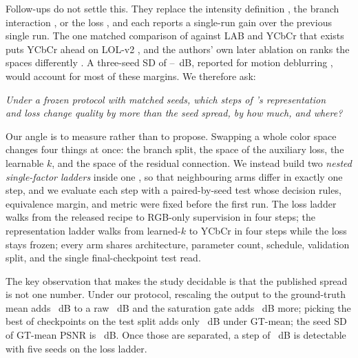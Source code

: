 Follow-ups do not settle this. They replace the intensity definition \citep{yang2026rhvifdd,
ai2026bcihv}, the branch interaction \citep{wang2026haimnet, wu2026tcanet}, or the loss
\citep{li2026pal}, and each reports a single-run gain over the previous single run. The one
matched comparison of \hvi against LAB and YCbCr that exists puts YCbCr ahead on LOL-v2
\citep{shi2025tpcnet}, and the authors' own later ablation on \dataset ranks the spaces
differently \citep{yan2025hvicidnetplus}. A three-seed SD of --~dB, reported for motion deblurring
\citep{shafi2026iphoneblur}, would account for most of these margins. We therefore ask:

\begin{center}
\emph{Under a frozen protocol with matched seeds, which steps of \mname's representation \\
and loss change \dataset quality by more than the seed spread, by how much, and where?}
\end{center}

Our angle is to measure rather than to propose. Swapping a whole color space changes four
things at once: the branch split, the space of the auxiliary loss, the learnable $k$, and the
space of the residual connection. We instead build two \emph{nested single-factor ladders}
inside one \mname, so that neighbouring arms differ in exactly one step, and we evaluate each
step with a paired-by-seed test whose decision rules, equivalence margin, and metric were
fixed before the first run. The loss ladder walks from the released recipe to RGB-only
supervision in four steps; the representation ladder walks from learned-$k$ \hvi to YCbCr in
four steps while the loss stays frozen; every arm shares architecture, parameter count,
schedule, validation split, and the single final-checkpoint test read.

The key observation that makes the study decidable is that the published spread is not one
number. Under our protocol, rescaling the output to the ground-truth mean adds ~dB to a
raw ~dB and the saturation gate adds ~dB more; picking the best of
 checkpoints on the test split adds only ~dB under GT-mean; the seed SD of
GT-mean PSNR is ~dB. Once those are separated, a step of ~dB is detectable with five seeds on the
loss ladder.

